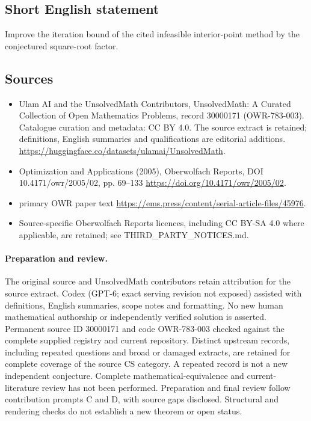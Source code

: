 \documentclass[11pt]{article}
\begin{document}
\subsection{Short English statement}
Improve the iteration bound of the cited infeasible interior-point method by the conjectured square-root factor.
\subsection{Sources}
\begin{itemize}
\item[\hypertarget{source:30000171:1}{S1}] Ulam AI and the UnsolvedMath Contributors, UnsolvedMath: A Curated Collection of Open Mathematics Problems, record 30000171 (OWR-783-003). Catalogue curation and metadata: CC BY 4.0. The source extract is retained; definitions, English summaries and qualifications are editorial additions.
\url{https://huggingface.co/datasets/ulamai/UnsolvedMath}.
\item[\hypertarget{source:30000171:2}{S2}] Optimization and Applications (2005), Oberwolfach Reports, DOI 10.4171/owr/2005/02, pp. 69--133
\url{https://doi.org/10.4171/owr/2005/02}.
\item[\hypertarget{source:30000171:3}{S3}] primary OWR paper text
\url{https://ems.press/content/serial-article-files/45976}.
\item Source-specific Oberwolfach Reports licences, including CC BY-SA 4.0 where applicable, are retained; see THIRD\_PARTY\_NOTICES.md.
\end{itemize}
\paragraph{Preparation and review.}
The original source and UnsolvedMath contributors retain attribution for the source extract. Codex (GPT-6; exact serving revision not exposed) assisted with definitions, English summaries, scope notes and formatting. No new human mathematical authorship or independently verified solution is asserted. Permanent source ID 30000171 and code OWR-783-003 checked against the complete supplied registry and current repository. Distinct upstream records, including repeated questions and broad or damaged extracts, are retained for complete coverage of the source CS category. A repeated record is not a new independent conjecture. Complete mathematical-equivalence and current-literature review has not been performed. Preparation and final review follow contribution prompts C and D, with source gaps disclosed. Structural and rendering checks do not establish a new theorem or open status.
\label{end:30000171}
\end{document}
